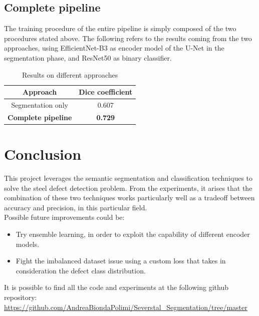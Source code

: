 \documentclass[10pt,twocolumn,letterpaper]{article}
\begin{document}
   \subsection{Complete pipeline}
      The training procedure of the entire pipeline is simply composed of the two procedures stated above.
      The following refers to the results coming from the two approaches, using EfficientNet-B3 as encoder model of the U-Net in the segmentation phase, and ResNet50 as binary classifier. 
      \begin{table}[h]
         \centering
         \begin{tabular}{||c c||} 
         \hline
         Approach & Dice coefficient\\ [0.5ex] 
         \hline\hline
         Segmentation only & 0.607 \\ 
         \hline
         \textbf{Complete pipeline} & \textbf{0.729} \\
         \hline
         \end{tabular}
         \caption{Results on different approaches}
         \label{table:res_finals}
      \end{table}


\section{Conclusion} 
   This project leverages the semantic segmentation and classification techniques to solve the steel defect detection problem. From the experiments, it arises that the combination of these two techniques works particularly well as a tradeoff between accuracy and precision, in this particular field.\\
   Possible future improvements could be:
   \begin{itemize}
      \item Try ensemble learning, in order to exploit the capability of different encoder models.
      \item Fight the imbalanced dataset issue using a custom loss that takes in consideration the defect class distribution.
   \end{itemize}
   It is possible to find all the code and experiments at the following github repository: \url{https://github.com/AndreaBiondaPolimi/Severstal_Segmentation/tree/master}


   

{\small


}
\end{document}
